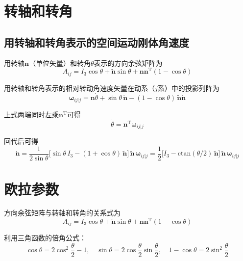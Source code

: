 \section{转轴和转角}

\subsection{用转轴和转角表示的空间运动刚体角速度}

用转轴$\boldsymbol{n}$（单位矢量）和转角$\theta$表示的方向余弦矩阵为
\begin{equation}
A_{ij} = I_3\cos\theta + \tilde{\boldsymbol{n}}\sin\theta + \boldsymbol{n}\boldsymbol{n}^{\mathrm{T}}(1 - \cos\theta)
\label{eq:7.1}
\end{equation}

用转轴和转角表示的相对转动角速度矢量在动系（$j$系）中的投影列阵为
\begin{equation}
\boldsymbol{\omega}_{ij|j} = \boldsymbol{n}\dot{\theta} + \sin\theta\,\dot{\boldsymbol{n}} - (1 - \cos\theta)\,\tilde{\boldsymbol{n}}\dot{\boldsymbol{n}}
\label{eq:7.2}
\end{equation}

上式两端同时左乘$\boldsymbol{n}^{\mathrm{T}}$可得
\begin{equation}
\dot{\theta} = \boldsymbol{n}^{\mathrm{T}}\boldsymbol{\omega}_{ij|j}
\end{equation}

回代后可得
\begin{equation}
\dot{\boldsymbol{n}} = \frac{1}{2\sin\theta}\bigl[\sin\theta\,I_3 - (1 + \cos\theta)\,\tilde{\boldsymbol{n}}\bigr]\,\tilde{\boldsymbol{n}}\,\boldsymbol{\omega}_{ij|j}
= \frac{1}{2}\bigl[I_3 - \mathrm{ctan}(\theta/2)\,\tilde{\boldsymbol{n}}\bigr]\,\tilde{\boldsymbol{n}}\,\boldsymbol{\omega}_{ij|j}
\label{eq:7.3}
\end{equation}

\section{欧拉参数}

方向余弦矩阵与转轴和转角的关系式为
\begin{equation}
A_{ij} = I_3\cos\theta + \tilde{\boldsymbol{n}}\sin\theta + \boldsymbol{n}\boldsymbol{n}^{\mathrm{T}}(1 - \cos\theta)
\end{equation}

利用三角函数的倍角公式：
\begin{equation}
\cos\theta = 2\cos^2\frac{\theta}{2} - 1, \quad
\sin\theta = 2\cos\frac{\theta}{2}\sin\frac{\theta}{2}, \quad
1 - \cos\theta = 2\sin^2\frac{\theta}{2}
\end{equation}

